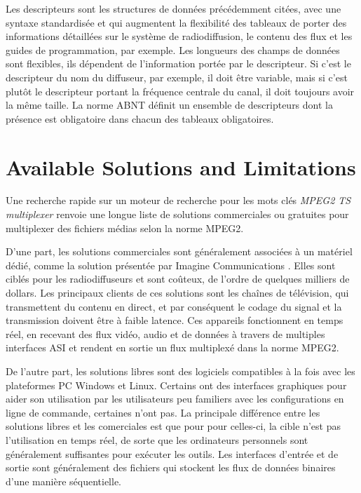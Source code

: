 \documentclass[12pt,a4paper]{article}
\begin{document}
Les descripteurs sont les structures de données précédemment citées, avec une syntaxe standardisée et qui augmentent la flexibilité des tableaux de porter des informations détaillées sur le système de radiodiffusion, le contenu des flux et les guides de programmation, par exemple. Les longueurs des champs de données sont flexibles, ils dépendent de l'information portée par le descripteur. Si c'est le descripteur du nom du diffuseur, par exemple, il doit être variable, mais si c'est plutôt le descripteur portant la fréquence centrale du canal, il doit toujours avoir la même taille. La norme ABNT définit un ensemble de descripteurs dont la présence est obligatoire dans chacun des tableaux obligatoires.

\section{Available Solutions and Limitations}

Une recherche rapide sur un moteur de recherche pour les mots clés \textit{MPEG2 TS multiplexer} renvoie une longue liste de solutions commerciales ou gratuites pour multiplexer des fichiers médias selon la norme MPEG2.

D'une part, les solutions commerciales sont généralement associées à un matériel dédié, comme la solution présentée par Imagine Communications \cite{harris}. Elles sont ciblés pour les radiodiffuseurs et sont coûteux, de l'ordre de quelques milliers de dollars. Les principaux clients de ces solutions sont les chaînes de télévision, qui transmettent du contenu en direct, et par conséquent le codage du signal et la transmission doivent être à faible latence. Ces appareils fonctionnent en temps réel, en recevant des flux vidéo, audio et de données à travers de multiples interfaces ASI et rendent en sortie un flux multiplexé dans la norme MPEG2.

De l'autre part, les solutions libres sont des logiciels compatibles à la fois avec les plateformes PC Windows et Linux. Certains ont des interfaces graphiques pour aider son utilisation par les utilisateurs peu familiers avec les configurations en ligne de commande, certaines n'ont pas. La principale différence entre les solutions libres et les comerciales est que pour pour celles-ci, la cible n'est pas l'utilisation en temps réel, de sorte que les ordinateurs personnels sont généralement suffisantes pour exécuter les outils. Les interfaces d'entrée et de sortie sont généralement des fichiers qui stockent les flux de données binaires d'une manière séquentielle.
\end{document}
